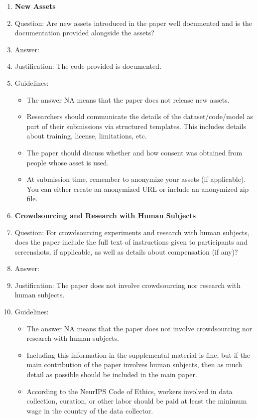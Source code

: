 \documentclass{article}
\begin{document}
\begin{enumerate}
\item {\bf New Assets}
    \item[] Question: Are new assets introduced in the paper well documented and is the documentation provided alongside the assets?
    \item[] Answer: \answerYes{} %
    \item[] Justification: The code provided is documented.
    \item[] Guidelines:
    \begin{itemize}
        \item The answer NA means that the paper does not release new assets.
        \item Researchers should communicate the details of the dataset/code/model as part of their submissions via structured templates. This includes details about training, license, limitations, etc. 
        \item The paper should discuss whether and how consent was obtained from people whose asset is used.
        \item At submission time, remember to anonymize your assets (if applicable). You can either create an anonymized URL or include an anonymized zip file.
    \end{itemize}

\item {\bf Crowdsourcing and Research with Human Subjects}
    \item[] Question: For crowdsourcing experiments and research with human subjects, does the paper include the full text of instructions given to participants and screenshots, if applicable, as well as details about compensation (if any)? 
    \item[] Answer: \answerNA{} %
    \item[] Justification: The paper does not involve crowdsourcing nor research with human subjects.
    \item[] Guidelines:
    \begin{itemize}
        \item The answer NA means that the paper does not involve crowdsourcing nor research with human subjects.
        \item Including this information in the supplemental material is fine, but if the main contribution of the paper involves human subjects, then as much detail as possible should be included in the main paper. 
        \item According to the NeurIPS Code of Ethics, workers involved in data collection, curation, or other labor should be paid at least the minimum wage in the country of the data collector. 
    \end{itemize}


\end{enumerate}
\end{document}
